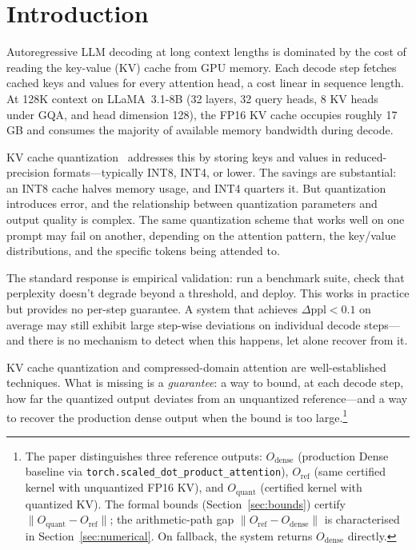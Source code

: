 \documentclass[10pt,twocolumn,a4paper]{article}
\theoremstyle{definition}
\theoremstyle{remark}
\newcommand{\norm}[1]{\lVert #1 \rVert}
\newcommand{\torchsdpa}{\texttt{torch.scaled\_\hspace{0pt}dot\_\hspace{0pt}product\_\hspace{0pt}attention}}
\begin{document}
\section{Introduction}
\label{sec:intro}

Autoregressive LLM decoding at long context lengths is dominated by the cost of reading the key-value (KV) cache from GPU memory.  Each decode step fetches cached keys and values for every attention head, a cost linear in sequence length.  At 128K context on LLaMA~3.1-8B (32 layers, 32 query heads, 8 KV heads under GQA, and head dimension 128), the FP16 KV cache occupies roughly 17\,GB and consumes the majority of available memory bandwidth during decode.

KV cache quantization~\cite{kvquant,kivi,qjl,innerq} addresses this by storing keys and values in reduced-precision formats---typically INT8, INT4, or lower.  The savings are substantial: an INT8 cache halves memory usage, and INT4 quarters it.  But quantization introduces error, and the relationship between quantization parameters and output quality is complex.  The same quantization scheme that works well on one prompt may fail on another, depending on the attention pattern, the key/value distributions, and the specific tokens being attended to.

The standard response is empirical validation: run a benchmark suite, check that perplexity doesn't degrade beyond a threshold, and deploy.  This works in practice but provides no per-step guarantee.  A system that achieves $\Delta\text{ppl} < 0.1$ on average may still exhibit large step-wise deviations on individual decode steps---and there is no mechanism to detect when this happens, let alone recover from it.

KV cache quantization and compressed-domain attention are well-established techniques.  What is missing is a \emph{guarantee}: a way to bound, at each decode step, how far the quantized output deviates from an unquantized reference---and a way to recover the production dense output when the bound is too large.\footnote{The paper distinguishes three reference outputs: $O_{\mathrm{dense}}$ (production Dense baseline via \torchsdpa{}), $O_{\mathrm{ref}}$ (same certified kernel with unquantized FP16 KV), and $O_{\mathrm{quant}}$ (certified kernel with quantized KV).  The formal bounds (Section~\ref{sec:bounds}) certify $\norm{O_{\mathrm{quant}} - O_{\mathrm{ref}}}$; the arithmetic-path gap $\norm{O_{\mathrm{ref}} - O_{\mathrm{dense}}}$ is characterised in Section~\ref{sec:numerical}.  On fallback, the system returns $O_{\mathrm{dense}}$ directly.}
\end{document}
